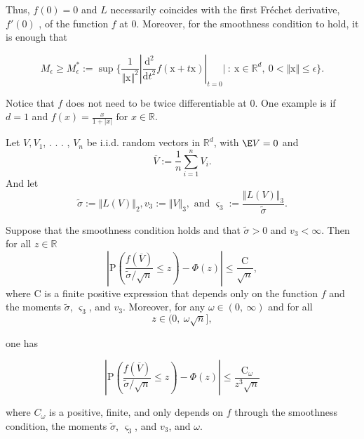 Thus, $f(0)=0$ and $L$ necessarily coincides with the first Fr\'{e}chet derivative, $f'(0)$ , of the function $f$ at $0$. Moreover, for the smoothness condition to hold, it is enough that 

\[
M_{\epsilon}\geq M_{\epsilon}^{*} :=\displaystyle \sup\{\frac{1}{\Vert \mathrm{x}\Vert^{2}}|\frac{\mathrm{d}^{2}}{\mathrm{d}t^{2}}f(\mathrm{x}+t\mathrm{x})|_{t=0}|\ :\ \mathrm{x}\in \mathbb{R}^{d},\ 0<\Vert \mathrm{x}\Vert\leq\epsilon\}.
\]

Notice that $f$ does not need to be twice differentiable at $0$. One example is if $d=1$ and $f(x)= \displaystyle \frac{x}{1+|x|} \textrm{ for } x\in \mathbb{R}.$


Let $V, V_{1}$, . . . , $V_{n}$ be i.i.d. random vectors in $\mathbb{R}^{d}$, with $\E V=0$ and
$$
\overline{V}:=\frac{1}{n}\sum_{i=1}^{n}V_{i}.
$$
And let
\begin{equation}\label{sigmatilde}
	 \tilde{\sigma} :=\Vert L(V)\Vert_{2}, v_{3} :=\Vert V\Vert_{3}, \textrm{ and } \varsigma_{3} :=\displaystyle \frac{\Vert L(V)\Vert_{3}}{\tilde{\sigma}}.
\end{equation}

\begin{theorem}\label{berryesseen}
	Suppose that the smoothness condition holds and that $\tilde{\sigma}>0$ and $v_{3}<\infty$. Then for all $z\in \mathbb{R}$
	\begin{equation}\label{berryesseen1}
		|\displaystyle \mathrm{P}(\frac{f(\overline{V})}{\tilde{\sigma}/\sqrt{n}}\leq z)-\Phi(z)|\leq\frac{\mathrm{C}}{\sqrt{n}},
	\end{equation}
	where $\mathrm{C}$ is a finite positive expression that depends only on the function $f$ and the moments $\tilde{\sigma}$, $\varsigma_{3}$, and $v_{3}$. Moreover, for any $\omega\in(0,\ \infty)$ and for all
	\begin{equation}\label{omega}
	z\in(0,\ \omega\sqrt{n}],
	\end{equation}

one has

\begin{equation}\label{berryesseen2}
|\mathrm{P}(\frac{f(\overline{V})}{\tilde{\sigma}/\sqrt{n}}\leq z)-\Phi(z)|\leq\frac{\mathrm{C}_{\omega}}{z^{3}\sqrt{n}}
\end{equation}

where $C_{\omega}$ is a positive, finite, and only depends on $f$ through the smoothness condition, the moments $\tilde{\sigma}$, $\varsigma_{3}$, and $v_3$, and $\omega$.
\end{theorem}

